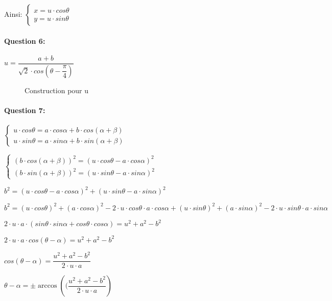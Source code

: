Ainsi:
$\left\{\begin{array}{l}
x=u\cdot cos\theta\\
y=u\cdot sin\theta
\end{array}\right.$

\paragraph{Question 6:} $u=\dfrac{a+b}{\sqrt{2}\cdot cos\left(\theta-\dfrac{\pi}{4}\right)}$

\begin{figure}[h!]
\begin{center}
  \resizebox{0.4\textwidth}{!}{}
  \caption{\label{fig06} Construction pour u}
\end{center}
\end{figure}

\paragraph{Question 7:}

$\left\{\begin{array}{l}
u\cdot cos\theta=a\cdot cos\alpha+b\cdot cos(\alpha+\beta)\\
u\cdot sin\theta=a\cdot sin\alpha+b\cdot sin(\alpha+\beta)
\end{array}\right.$

$\left\{\begin{array}{l}
(b\cdot cos(\alpha+\beta))^2=(u\cdot cos\theta-a\cdot cos\alpha)^2\\
(b\cdot sin(\alpha+\beta))^2=(u\cdot sin\theta-a\cdot sin\alpha)^2
\end{array}\right.$

$b^2=(u\cdot cos\theta-a\cdot cos\alpha)^2+(u\cdot sin\theta-a\cdot sin\alpha)^2$

$b^2=(u\cdot cos\theta)^2+(a\cdot cos\alpha)^2-2\cdot u\cdot cos\theta\cdot a\cdot cos\alpha+(u\cdot sin\theta)^2+(a\cdot sin\alpha)^2-2\cdot u\cdot sin\theta\cdot a\cdot sin\alpha$

$2\cdot u\cdot a\cdot \left(sin\theta\cdot sin\alpha+cos\theta\cdot cos\alpha\right)=u^2+a^2-b^2$

$2\cdot u\cdot a\cdot cos(\theta-\alpha)=u^2+a^2-b^2$

$cos(\theta-\alpha)=\dfrac{u^2+a^2-b^2}{2\cdot u\cdot a}$

$\theta-\alpha=\pm\arccos\left((\dfrac{u^2+a^2-b^2}{2\cdot u\cdot a}\right)$

